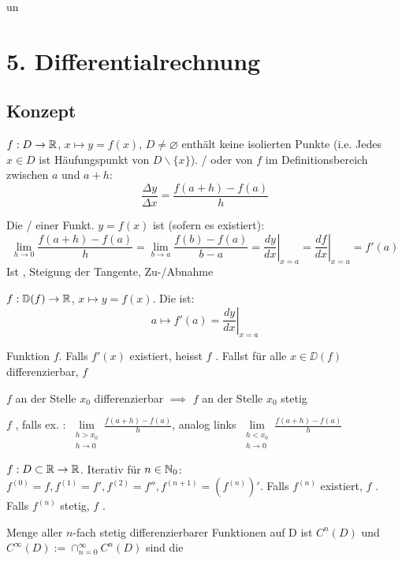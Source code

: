 un\section{5. Differentialrechnung}

\subsection{Konzept}

\Def $f: D \to \mathbb{R}$, $x \mapsto y = f(x)$, $D \neq \varnothing$ enthält keine
isolierten Punkte (i.e. Jedes $x \in D$ ist Häufungspunkt von $D \backslash \{x\}$).
/ oder 
von $f$ im Definitionsbereich zwischen $a$ und $a+h$:
$$\frac{\Delta y}{\Delta x} = \frac{f(a+h) - f(a)}{h}$$

\Def Die / einer Funkt. $y = f(x)$ 
ist (sofern es existiert):
$$\lim\limits_{h\to 0} \frac{f(a+h)-f(a)}{h} = \lim\limits_{b\to a}\frac{f(b) - f(a)}{b - a} = \left.\frac{dy}{dx}\right|_{x=a} = \left.\frac{df}{dx}\right|_{x=a} = f'(a)$$
Ist , Steigung der Tangente,  Zu-/Abnahme

\Def $f: \mathbb{D}(f) \to \mathbb{R}$, $x \mapsto y = f(x)$. Die  ist:
$$a \mapsto f'(a) = \left. \frac{dy}{dx} \right|_{x=a}$$

\Def Funktion $f$. Falls $f'(x)$ existiert, heisst $f$ .
Fallst für alle $x \in \DD(f)$ differenzierbar, $f$ 

\Satz $f$ an der Stelle $x_0$ differenzierbar $\implies$ $f$ an der Stelle $x_0$ stetig

\Def $f$ , falls ex. :
$\lim\limits_{\substack{h > x_0 \\ h \to 0}}\frac{f(a+h) - f(a)}{h}$, analog links
$\lim\limits_{\substack{h < x_0 \\ h \to 0}}\frac{f(a+h) - f(a)}{h}$

\Def $f: D \subset \mathbb{R} \to \mathbb{R}$. Iterativ  für $n \in \mathbb{N}_0$:
$f^{(0)} = f, f^{(1)} = f', f^{(2)} = f'', f^{(n+1)} = (f^{(n)})'$.
Falls $f^{(n)}$ existiert, $f$ . Falls $f^{(n)}$ stetig,
$f$ .

\Def Menge aller $n$-fach stetig differenzierbarer Funktionen auf D ist $C^n(D)$ und
$C^\infty(D) := \cap_{n=0}^\infty C^n(D)$ sind die 

